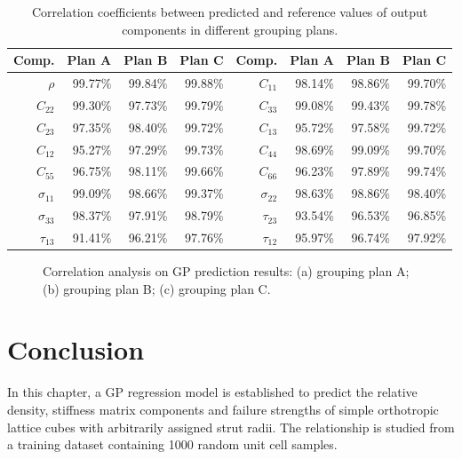 \documentclass[12pt]{extbook}
\begin{document}
\begin{table}[h]
\centering
\caption{Correlation coefficients between predicted and reference values of output components in different grouping plans.}
\begin{tabular}{rrrr|rrrr}
\hline\hline
Comp. & Plan A & Plan B & Plan C & Comp. & Plan A & Plan B & Plan C\\
\hline
$\rho$ & 99.77\% & 99.84\% & 99.88\% & $C_{11}$ & 98.14\% & 98.86\% & 99.70\%\\
$C_{22}$ & 99.30\% & 97.73\% & 99.79\% & $C_{33}$ & 99.08\% & 99.43\% & 99.78\%\\
$C_{23}$ & 97.35\% & 98.40\% & 99.72\% & $C_{13}$ & 95.72\% & 97.58\% & 99.72\%\\
$C_{12}$ & 95.27\% & 97.29\% & 99.73\% & $C_{44}$ & 98.69\% & 99.09\% & 99.70\%\\
$C_{55}$ & 96.75\% & 98.11\% & 99.66\% & $C_{66}$ & 96.23\% & 97.89\% & 99.74\%\\
$\sigma_{11}$ & 99.09\% & 98.66\% & 99.37\% & $\sigma_{22}$ & 98.63\% & 98.86\% & 98.40\%\\
$\sigma_{33}$ & 98.37\% & 97.91\% & 98.79\% & $\tau_{23}$ & 93.54\% & 96.53\% & 96.85\%\\
$\tau_{13}$ & 91.41\% & 96.21\% & 97.76\% & $\tau_{12}$ & 95.97\% & 96.74\% & 97.92\%\\
\hline\hline
\end{tabular}
\label{correlation}
\end{table}

\begin{figure}[htbp]
\centering
{}
\caption{Correlation analysis on GP prediction results: (a) grouping plan A; (b) grouping plan B; (c) grouping plan C.}
\label{correlation_plt}
\end{figure}

\section{Conclusion}
\label{gauss_conc}

In this chapter, a GP regression model is established to predict the relative density, stiffness matrix components and failure strengths of simple orthotropic lattice cubes with arbitrarily assigned strut radii. The relationship is studied from a training dataset containing 1000 random unit cell samples.\\
\end{document}
